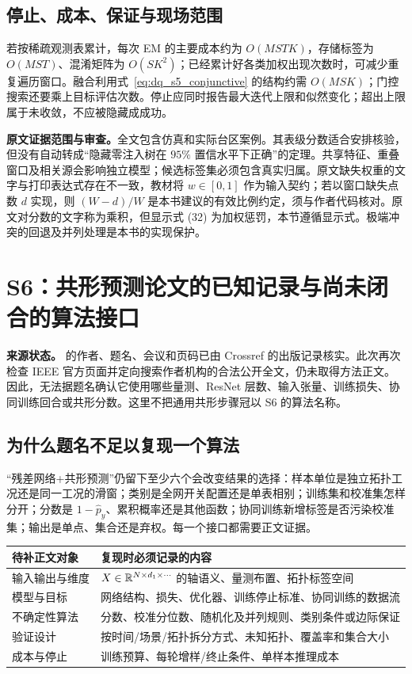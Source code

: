 \subsection{停止、成本、保证与现场范围}

若按稀疏观测表累计，每次 EM 的主要成本约为 $O(MSTK)$，存储标签为 $O(MST)$、混淆矩阵为 $O(SK^2)$；已经累计好各类加权出现次数时，可减少重复遍历窗口。融合利用式~\eqref{eq:dq_s5_conjunctive} 的结构约需 $O(MSK)$；门控搜索还要乘上目标评估次数。停止应同时报告最大迭代上限和似然变化；超出上限属于未收敛，不应被隐藏成成功。

\textbf{原文证据范围与审查。}全文包含仿真和实际台区案例。其表级分数适合安排核验，但没有自动转成“隐藏零注入树在 $95\%$ 置信水平下正确”的定理。共享特征、重叠窗口及相关源会影响独立模型；候选标签集必须包含真实归属。原文缺失权重的文字与打印表达式存在不一致，教材将 $w\in[0,1]$ 作为输入契约；若以窗口缺失点数 $d$ 实现，则 $(W-d)/W$ 是本书建议的有效比例约定，须与作者代码核对。原文对分数的文字称为乘积，但显示式 (32) 为加权惩罚，本节遵循显示式。极端冲突的回退及并列处理是本书的实现保护。

\section{S6：共形预测论文的已知记录与尚未闭合的算法接口}
\label{sec:dq_s6}

\textbf{来源状态。}\citet{S6} 的作者、题名、会议和页码已由 Crossref 的出版记录核实。此次再次检查 IEEE 官方页面并定向搜索作者机构的合法公开全文，仍未取得方法正文。因此，无法据题名确认它使用哪些量测、ResNet 层数、输入张量、训练损失、协同训练回合或共形分数。这里不把通用共形步骤冠以 S6 的算法名称。

\subsection{为什么题名不足以复现一个算法}

“残差网络+共形预测”仍留下至少六个会改变结果的选择：样本单位是独立拓扑工况还是同一工况的滑窗；类别是全网开关配置还是单表相别；训练集和校准集怎样分开；分数是 $1-\hat p_y$、累积概率还是其他函数；协同训练新增标签是否污染校准集；输出是单点、集合还是弃权。每一个接口都需要正文证据。

\begin{center}
\begin{tabularx}{\textwidth}{@{}lX@{}}
\toprule
待补正文对象 & 复现时必须记录的内容 \\
\midrule
输入输出与维度 & $X\in\mathbb{R}^{N\times d_1\times\cdots}$ 的轴语义、量测布置、拓扑标签空间 \\
模型与目标 & 网络结构、损失、优化器、训练停止标准、协同训练的数据流 \\
不确定性算法 & 分数、校准分位数、随机化及并列规则、类别条件或边际保证 \\
验证设计 & 按时间/场景/拓扑拆分方式、未知拓扑、覆盖率和集合大小 \\
成本与停止 & 训练预算、每轮增样/终止条件、单样本推理成本 \\
\bottomrule
\end{tabularx}
\end{center}

